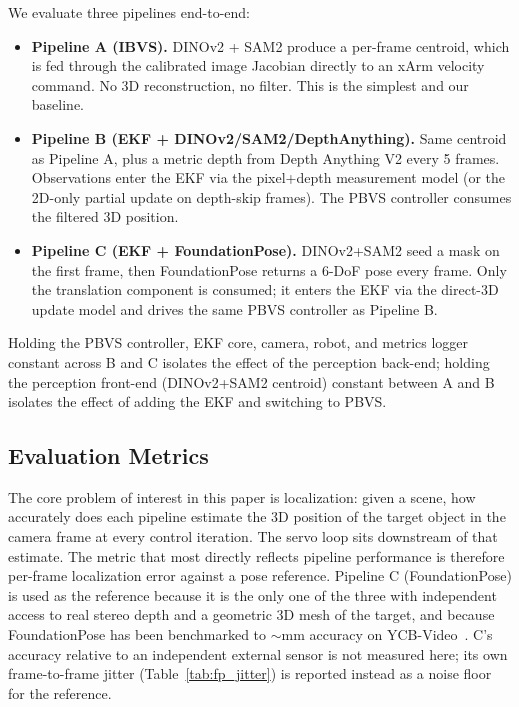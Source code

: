 \documentclass[letterpaper, 10 pt, conference]{ieeeconf}  %
\begin{document}
We evaluate three pipelines end-to-end:
\begin{itemize}
\item \textbf{Pipeline A (IBVS).} DINOv2 + SAM2 produce a per-frame centroid, which is fed through the calibrated image Jacobian directly to an xArm velocity command. No 3D reconstruction, no filter. This is the simplest and our baseline.
\item \textbf{Pipeline B (EKF + DINOv2/SAM2/DepthAnything).} Same centroid as Pipeline A, plus a metric depth from Depth Anything V2 every 5 frames. Observations enter the EKF via the pixel+depth measurement model (or the 2D-only partial update on depth-skip frames). The PBVS controller consumes the filtered 3D position.
\item \textbf{Pipeline C (EKF + FoundationPose).} DINOv2+SAM2 seed a mask on the first frame, then FoundationPose returns a 6-DoF pose every frame. Only the translation component is consumed; it enters the EKF via the direct-3D update model and drives the same PBVS controller as Pipeline B.
\end{itemize}

Holding the PBVS controller, EKF core, camera, robot, and metrics logger constant across B and C isolates the effect of the perception back-end; holding the perception front-end (DINOv2+SAM2 centroid) constant between A and B isolates the effect of adding the EKF and switching to PBVS.

\subsection{Evaluation Metrics}

The core problem of interest in this paper is localization: given a scene, how accurately does each pipeline estimate the 3D position of the target object in the camera frame at every control iteration. The servo loop sits downstream of that estimate. The metric that most directly reflects pipeline performance is therefore per-frame localization error against a pose reference. Pipeline C (FoundationPose) is used as the reference because it is the only one of the three with independent access to real stereo depth and a geometric 3D mesh of the target, and because FoundationPose has been benchmarked to $\sim$mm accuracy on YCB-Video~\cite{foundationpose}. C's accuracy relative to an independent external sensor is not measured here; its own frame-to-frame jitter (Table~\ref{tab:fp_jitter}) is reported instead as a noise floor for the reference.
\end{document}
